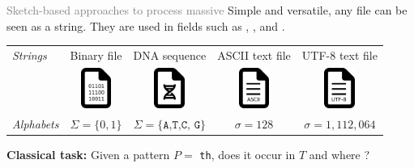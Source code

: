 \begin{frame}{\textcolor{gray}{Sketch-based approaches to process massive }}
    \pause
    \small
    Simple and versatile, any file can be seen as a string.
    They are used in fields such as , , and .

    \medskip
    \begin{tabular}{l  c c c c}
        \emph{Strings} & Binary file & DNA sequence & ASCII text file & UTF-8 text file \\
        \rule{0pt}{10ex}    
        &
        \includegraphics[width=1cm]{pictures/file-bin.png}&
        \includegraphics[width=1cm]{pictures/file-dna.png}&
        \includegraphics[width=1cm]{pictures/file-ascii.png}&
        \includegraphics[width=1cm]{pictures/file-utf-8.png}
        \\
        \rule{0pt}{4ex}  
        \emph{Alphabets} & $\Sigma=\{0,1\}$ & $\Sigma=\{\texttt{A,T,C, G}\}$ & $\sigma=128$ & $\sigma = 1,112,064$\\
    \end{tabular}
    \bigskip

    \textbf{Classical task:} Given a pattern $P =$ \texttt{th}, does it occur in  $T$ and where ?
    
    \begin{center}
        \\
    \end{center}

\end{frame}

